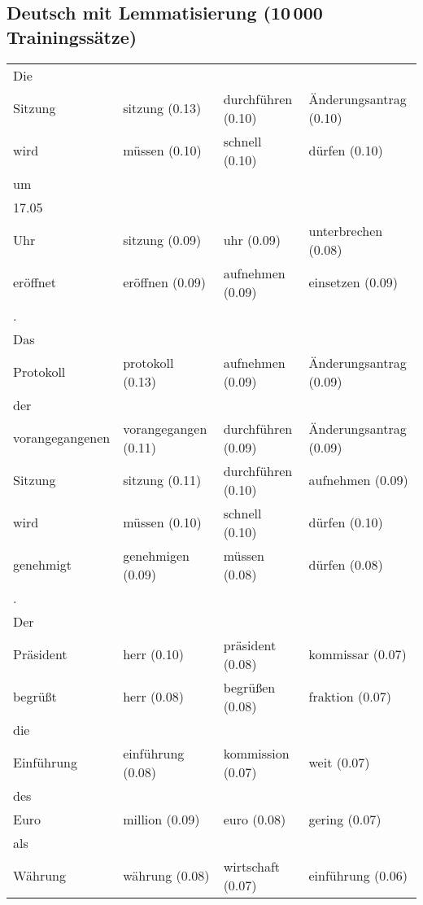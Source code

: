 \documentclass[11pt,twoside,openright]{mpreport}
\begin{document}
\subsection{Deutsch mit Lemmatisierung (10\,000 Trainingssätze)}
\hspace{-2.7cm}\begin{footnotesize}\begin{tabular}{|llll|}
\hline
Die & & & \\
Sitzung                 & sitzung (0.13) & durchführen (0.10) & Änderungsantrag (0.10) \\
wird                    & müssen (0.10) & schnell (0.10) & dürfen (0.10) \\
um & & & \\
17.05 & & & \\
Uhr                     & sitzung (0.09) & uhr (0.09) & unterbrechen (0.08) \\
eröffnet               & eröffnen (0.09) & aufnehmen (0.09) & einsetzen (0.09) \\
. & & & \\
Das & & & \\
Protokoll               & protokoll (0.13) & aufnehmen (0.09) & Änderungsantrag (0.09) \\
der & & & \\
vorangegangenen         & vorangegangen (0.11) & durchführen (0.09) & Änderungsantrag (0.09) \\
Sitzung                 & sitzung (0.11) & durchführen (0.10) & aufnehmen (0.09) \\
wird                    & müssen (0.10) & schnell (0.10) & dürfen (0.10) \\
genehmigt               & genehmigen (0.09) & müssen (0.08) & dürfen (0.08) \\
. & & & \\
Der & & & \\
Präsident              & herr (0.10) & präsident (0.08) & kommissar (0.07) \\
begrüßt               & herr (0.08) & begrüßen (0.08) & fraktion (0.07) \\
die & & & \\
Einführung             & einführung (0.08) & kommission (0.07) & weit (0.07) \\
des & & & \\
Euro                    & million (0.09) & euro (0.08) & gering (0.07) \\
als & & & \\
Währung                & währung (0.08) & wirtschaft (0.07) & einführung (0.06) \\

\end{tabular}
\end{footnotesize}
\end{document}
